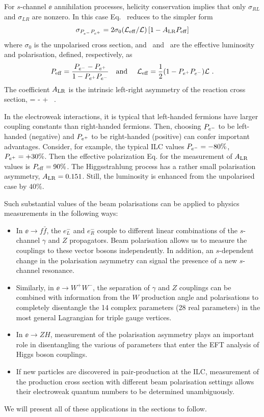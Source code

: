 For $s$-channel $\ee$ annihilation processes, helicity conservation implies that only $\sigma_{RL}$ and $\sigma_{LR}$ are nonzero.
In this case Eq.~ reduces to the simpler form
\begin{equation}
 \sigma_{P_{e^-}P_{e^+}} = 2 \sigma_0 (\mathcal{L}_{\mathrm{eff}}/\mathcal{L}) \left[1 - A_{\mathrm{LR}} P_{\mathrm{eff}} \right]
\label{eq:pol:xsecschan}
\end{equation}
where $\sigma_0$ is the unpolarised cross section, and \Leff\ and \Peff\  
are the effective luminosity and polarisation, defined, respectively, as 
\begin{equation}
P_{\mathrm{eff}}= \frac{P_{e^-} - P_{e^+}}{1 - P_{e^+}P_{e^-}}
\label{eq:def-leff-peff}
\quad\mbox{\rm and }\quad
\mathcal{L}_{\mathrm{eff}}=\frac{1}{2}(1 -P_{e^+}P_{e^-}){\cal L} \ . 
\end{equation}
The coefficient $A_{\mathrm{LR}}$ is the intrinsic left-right asymmetry of the reaction cross section,
\beq
  \ALR =    {\sigmaLR - \sigmaRL\over \sigmaLR + \sigmaRL } \ . 
\eeq{eq:def-ALR}

In the electroweak interactions, it is typical that left-handed fermions have larger coupling constants than right-handed fermions.   Then, choosing $P_{e^-}$ to be left-handed (negative) and $P_{e^+}$ to be right-handed (positive) can confer important advantages.
Consider, for example, the typical ILC values $P_{e^-} = -80\%$, $P_{e^+} = +30\%$.    Then the effective polarization 
Eq. \leqn{eq:def-leff-peff} for the measurement of $A_{\mathrm{LR}}$ values is  $P_{\mathrm{eff}} = 90\%$.   The Higgsstrahlung process has a rather small polarisation asymmetry, $A_{\mathrm{LR}} = 0.151$. Still, the luminosity is enhanced from the unpolarised case by  $ 40\%$. 

Such substantial values of the beam polarisations can be applied to physics measurements in the following ways:
\begin{itemize}
\item In $\ee\to f\bar f$, the $e^-_L$ and $e^-_R$ couple to different linear combinations of the $s$-channel $\gamma$ and $Z$
propagators.  Beam polarisation allows us to measure the couplings to these vector bosons independently.  In addition, an $s$-dependent change in the polarisation asymmetry can signal the presence of a new $s$-channel resonance.  
\item Similarly, in $\ee\to W^+W^-$, the separation of $\gamma$ and $Z$ couplings can be combined with information from the $W$ production angle and polarisations to completely disentangle the 14 complex parameters (28 real parameters) in the most general 
Lagrangian for triple gauge vertices.
\item In $\ee\to ZH$, measurement of  the polarisation asymmetry plays an important role in disentangling the various of  parameters 
that enter the EFT analysis of Higgs boson couplings.
\item If new particles are discovered in pair-production at the ILC, measurement of the production cross section with different beam polarisation settings allows their electroweak quantum numbers to be determined unambiguously.
\end{itemize}
We will present all of these applications in the sections to follow.

